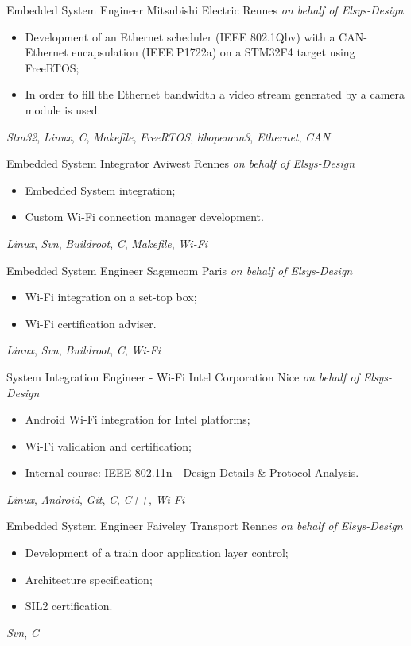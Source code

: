 \documentclass[11pt,a4paper,sans]{moderncv}
\begin{document}
	{Embedded System Engineer}
	{Mitsubishi Electric}
	{Rennes}
	{\textit{on behalf of Elsys-Design}}
	{
		\begin{itemize}
		\item Development of an Ethernet scheduler (IEEE 802.1Qbv)
			with a CAN-Ethernet encapsulation (IEEE P1722a)
			on a STM32F4 target using FreeRTOS;
		\item In order to fill the Ethernet bandwidth a video stream
			generated by a camera module is used.
		\end{itemize}
		\textit{Stm32},
		\textit{Linux},
		\textit{C}, \textit{Makefile},
		\textit{FreeRTOS}, \textit{libopencm3},
		\textit{Ethernet}, \textit{CAN}
	}
	{Embedded System Integrator}
	{Aviwest}
	{Rennes}
	{\textit{on behalf of Elsys-Design}}
	{
		\begin{itemize}
		\item Embedded System integration;
		\item Custom Wi-Fi connection manager development.
		\end{itemize}
		\textit{Linux},
		\textit{Svn},
		\textit{Buildroot},
		\textit{C}, \textit{Makefile},
		\textit{Wi-Fi}
	}
	{Embedded System Engineer}
	{Sagemcom}
	{Paris}
	{\textit{on behalf of Elsys-Design}}
	{
		\begin{itemize}
		\item Wi-Fi integration on a set-top box;
		\item Wi-Fi certification adviser.
		\end{itemize}
		\textit{Linux},
		\textit{Svn},
		\textit{Buildroot},
		\textit{C},
		\textit{Wi-Fi}
	}
	{System Integration Engineer - Wi-Fi}
	{Intel Corporation}
	{Nice}
	{\textit{on behalf of Elsys-Design}}
	{
		\begin{itemize}
		\item Android Wi-Fi integration for Intel platforms;
		\item Wi-Fi validation and certification;
		\item Internal course: IEEE 802.11n
			- Design Details \& Protocol Analysis.
		\end{itemize}
		\textit{Linux}, \textit{Android},
		\textit{Git},
		\textit{C}, \textit{C++},
		\textit{Wi-Fi}
	}
	{Embedded System Engineer}
	{Faiveley Transport}
	{Rennes}
	{\textit{on behalf of Elsys-Design}}
	{
		\begin{itemize}
		\item Development of a train door application layer control;
		\item Architecture specification;
		\item SIL2 certification.
		\end{itemize}
		\textit{Svn},
		\textit{C}
	}
\end{document}
